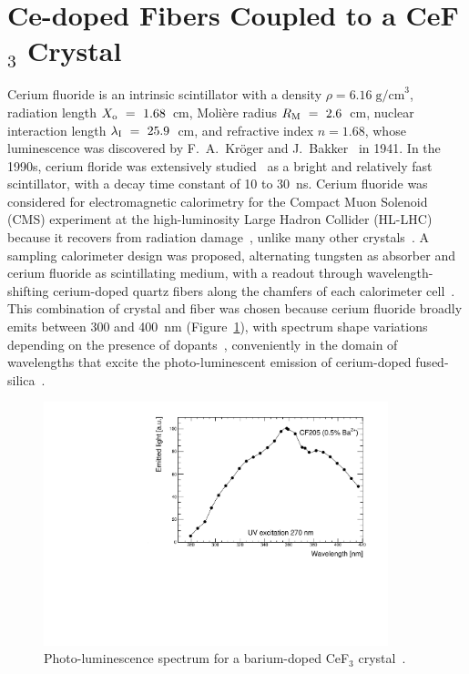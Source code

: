 \documentclass[a4paper,11pt]{article}
\begin{document}
\section{Ce-doped Fibers Coupled to a CeF\texorpdfstring{$_3$}{} Crystal}
\label{sec:WLS}
Cerium fluoride is an intrinsic scintillator with a density $\rho=6.16\; {\mathrm{g/cm}}^3$, radiation length $X_{\rm o}~=~1.68$~cm, Moli\`ere radius $R_{\rm M}~=~2.6$~cm, nuclear interaction length $\lambda_{\rm I}~=~25.9$~cm, and refractive index $n = 1.68$, whose luminescence was discovered by F.~A.~Kr\"oger and J.~Bakker~\cite{r-KRO} in 1941. In the 1990s, cerium floride was extensively studied~\cite{r-AND,r-MOS} as a bright and relatively fast scintillator, with a decay time constant of 10 to 30~ns. Cerium fluoride was considered for electromagnetic calorimetry for the Compact Muon Solenoid (CMS) experiment at the high-luminosity Large Hadron Collider (HL-LHC) because it recovers from radiation damage~\cite{r-NIMCEF3}, unlike many other crystals~\cite{r-FISSNIM, r-NIMLYSO}. A sampling calorimeter design was proposed, alternating tungsten as absorber and cerium fluoride as scintillating medium, with a readout through wavelength-shifting cerium-doped quartz fibers along the chamfers of each calorimeter cell~\cite{r-CALORCEF3, r-WCEF3FRA, r-WCEF3H4}. This combination of crystal and fiber was chosen because cerium fluoride broadly emits between 300 and 400~nm (Figure~\ref{fig:cef3spectrum}), with spectrum shape variations depending on the presence of dopants~\cite{r-EACEF3}, conveniently in the domain of wavelengths that excite the photo-luminescent emission of cerium-doped fused-silica~\cite{r-vedda}.

\begin{figure}[ht]
\begin{center}
      \includegraphics[width=10cm]{Figures/SpectrumCeF3.pdf}
\caption{\small Photo-luminescence spectrum for a barium-doped CeF$_3$ crystal~\cite{r-EACEF3}.}
    \label{fig:cef3spectrum}
\end{center}
\end{figure}
\end{document}
